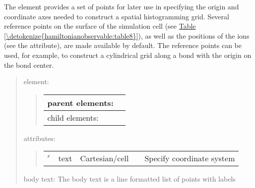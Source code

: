 \documentclass[letterpaper,10pt,english]{sphinxmanual}
\begin{document}
The  element provides a set of points for later
use in specifying the origin and coordinate axes needed to construct a
spatial histogramming grid. Several reference points on the surface of
the simulation cell (see \hyperref[\detokenize{hamiltonianobservable:table8}]{Table \ref{\detokenize{hamiltonianobservable:table8}}}), as well as the
positions of the ions (see the  attribute), are
made available by default. The reference points can be used, for
example, to construct a cylindrical grid along a bond with the origin on
the bond center.
\begin{quote}

 element:
\begin{quote}


\begin{savenotes}\sphinxattablestart
\centering
\begin{tabulary}{\linewidth}[t]{|T|T|}
\hline

parent elements:
&
\\
\hline
child elements:
&
\\
\hline
\end{tabulary}
\par
\sphinxattableend\end{savenotes}
\end{quote}

attributes:
\begin{quote}


\begin{savenotes}\sphinxattablestart
\centering
\begin{tabulary}{\linewidth}[t]{|T|T|T|T|T|}
\hline
\sphinxstyletheadfamily 
{}
&\sphinxstyletheadfamily 
{}
&\sphinxstyletheadfamily 
{}
&\sphinxstyletheadfamily 
{}
&\sphinxstyletheadfamily 
{}
\\
\hline
{}\(^r\)
&
text
&
Cartesian/cell
&&
Specify coordinate system
\\
\hline
\end{tabulary}
\par
\sphinxattableend\end{savenotes}
\end{quote}

body text: The body text is a line formatted list of points with labels
\end{quote}
\end{document}
